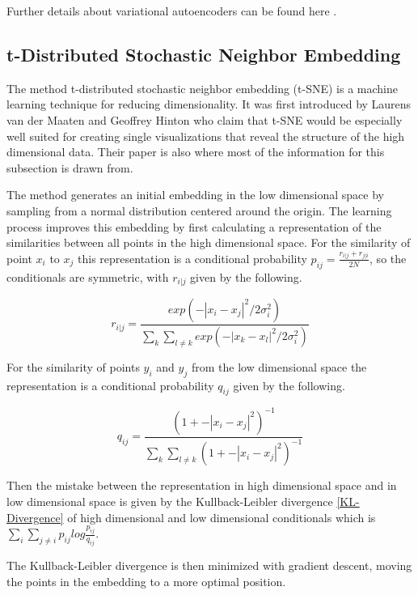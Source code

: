 Further details about variational autoencoders can be found here \parencite{2016-doersch-tutorial}.

\subsection{t-Distributed Stochastic Neighbor Embedding} \label{t-sne}

The method t-distributed stochastic neighbor embedding (t-SNE) is a machine learning technique for reducing
dimensionality. It was first 
introduced by Laurens van der Maaten and Geoffrey Hinton \parencite{2008-vanDerMaaten-visualizing} who
claim that t-SNE would be especially well suited for creating single visualizations that reveal the 
structure of the high dimensional data. Their paper is also where most of the information for this 
subsection is drawn from.

The method generates an initial embedding in the low dimensional space by sampling from a normal distribution 
centered around the origin. The learning process improves this embedding by first calculating a 
representation of the similarities between all points in the high dimensional space. For the similarity of point
$x_{i}$ to $x_{j}$ this representation is a conditional probability $p_{ij}=\frac{r_{i|j} + r_{j|i}}{2N}$,
so the conditionals are symmetric, with 
$r_{i|j}$ given by the following.

\begin{equation} \label{pij}
    r_{i|j}=\frac{exp(-|x_{i}-x_{j}|^2/2\sigma_{i}^2)}{\sum_{k}\sum_{l\neq k} exp(-|x_{k}-x_{l}|^2/2\sigma_{i}^2)}
\end{equation}

For the similarity of points $y_{i}$ and $y_{j}$ from the low dimensional space the representation is a conditional
probability $q_{ij}$ given by the following.

\begin{equation} \label{qij}
    q_{ij}=\frac{(1 + -|x_{i}-x_{j}|^2)^{-1}}{\sum_{k}\sum_{l\neq k} (1 + -|x_{i}-x_{j}|^2)^{-1}}
\end{equation}

Then the mistake between the representation in high dimensional space and in low dimensional space is
given by the Kullback-Leibler divergence \ref{KL-Divergence} of high dimensional and low dimensional
conditionals which is $\sum_{i}\sum_{j\neq i}p_{ij}log \frac{p_{ij}}{q_{ij}}$.

The Kullback-Leibler divergence is then minimized with gradient descent, moving the points in the embedding to
a more optimal position.